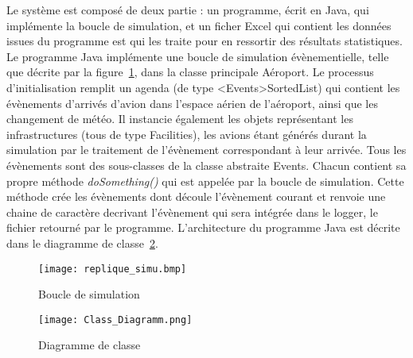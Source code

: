 

Le système est composé de deux partie : un programme, écrit en Java,  qui implémente la boucle de simulation, et un ficher Excel qui contient les données issues du programme est qui les traite pour en ressortir des résultats statistiques.
\\
Le programme Java implémente une boucle de simulation évènementielle, telle que décrite par la figure~\ref{replique}, dans la classe principale Aéroport. 
Le processus d'initialisation remplit un agenda (de type <Events>SortedList) qui contient les évènements d'arrivés d'avion dans l'espace aérien de l'aéroport, ainsi que les changement de météo. Il instancie également les objets représentant les infrastructures (tous de type Facilities), les avions étant générés durant la simulation par le traitement de l'évènement correspondant à leur arrivée.
Tous les évènements sont des sous-classes de la classe abstraite Events. Chacun contient sa propre méthode \textit{doSomething()} qui est appelée par la boucle de simulation. Cette méthode crée les évènements dont découle l'évènement courant et renvoie une chaine de caractère decrivant l'évènement qui sera intégrée dans le logger, le fichier retourné par le programme.
L'architecture du programme Java est décrite dans le diagramme de classe~\ref{class_diagramm}.

 \begin{figure}[h]
   \caption{\label{replique} Boucle de simulation}
 \texttt{[image: replique\_simu.bmp]}
 \end{figure}


\begin{figure}[h]
   \caption{\label{class_diagramm} Diagramme de classe}
 \texttt{[image: Class\_Diagramm.png]}
 \end{figure}
 
